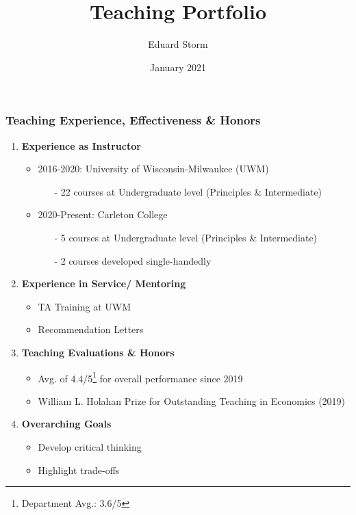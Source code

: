 \documentclass[10pt]{beamer}
\title[Teaching]{Teaching Portfolio} %
\author{Eduard Storm} %
\institute[estorm@carleton.edu]
{
	
	
	\medskip 
	
	
	
	
}
\date{January 2021} %
\begin{document}
\begin{frame}
\titlepage %
\end{frame}


\begin{frame} 
	\frametitle{Teaching Experience, Effectiveness \& Honors}
	
	
	\begin{enumerate}
		\item \textbf{Experience as Instructor}
			\begin{itemize}
				\item 2016-2020: University of Wisconsin-Milwaukee (UWM)%
					\begin{itemize}
						\item [-] 22 courses at Undergraduate level (Principles \& Intermediate)
					\end{itemize}
				\item 2020-Present: Carleton College
					\begin{itemize}
						\item [-] 5 courses at Undergraduate level (Principles \& Intermediate)
						\item [-] 2 courses developed single-handedly
					\end{itemize}				
			\end{itemize}
		\smallskip
		\item \textbf{Experience in Service/ Mentoring}
			\begin{itemize}
				\item TA Training at UWM
				\item Recommendation Letters%
			\end{itemize}
		\smallskip
		\item \textbf{Teaching Evaluations \& Honors}
			\begin{itemize}
				\item Avg. of 4.4/5\footnote[frame]{Department Avg.: 3.6/5} for overall performance since 2019
				\item William L. Holahan Prize for Outstanding Teaching in Economics (2019)
			\end{itemize}
		\smallskip
		\item \textbf{Overarching Goals}
			\begin{itemize}
				\item Develop critical thinking 
				\item Highlight trade-offs 
			\end{itemize}
	\end{enumerate}
	
	
\end{frame}
\end{document}

